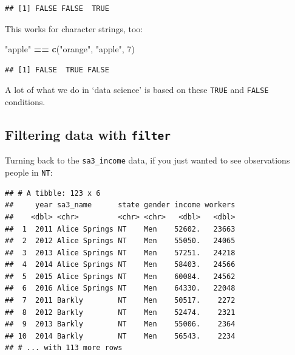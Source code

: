 \documentclass[]{book}
\newenvironment{Shaded}{\begin{snugshade}}{\end{snugshade}}
\newcommand{\DecValTok}[1]{\textcolor[rgb]{0.00,0.00,0.81}{#1}}
\newcommand{\KeywordTok}[1]{\textcolor[rgb]{0.13,0.29,0.53}{\textbf{#1}}}
\newcommand{\NormalTok}[1]{#1}
\newcommand{\OperatorTok}[1]{\textcolor[rgb]{0.81,0.36,0.00}{\textbf{#1}}}
\newcommand{\StringTok}[1]{\textcolor[rgb]{0.31,0.60,0.02}{#1}}
\begin{document}
\begin{verbatim}
## [1] FALSE FALSE  TRUE
\end{verbatim}

This works for character strings, too:

\begin{Shaded}
\begin{Highlighting}[]
\StringTok{"apple"} \OperatorTok{==}\StringTok{ }\KeywordTok{c}\NormalTok{(}\StringTok{"orange"}\NormalTok{, }\StringTok{"apple"}\NormalTok{, }\DecValTok{7}\NormalTok{)}
\end{Highlighting}
\end{Shaded}

\begin{verbatim}
## [1] FALSE  TRUE FALSE
\end{verbatim}

A lot of what we do in `data science' is based on these \texttt{TRUE} and \texttt{FALSE} conditions.

\hypertarget{filtering-data-with-filter}{%
\subsection{\texorpdfstring{Filtering data with \texttt{filter}}{Filtering data with filter}}\label{filtering-data-with-filter}}

Turning back to the \texttt{sa3\_income} data, if you just wanted to see observations people in \texttt{NT}:

\begin{Shaded}
\end{Shaded}

\begin{verbatim}
## # A tibble: 123 x 6
##     year sa3_name      state gender income workers
##    <dbl> <chr>         <chr> <chr>   <dbl>   <dbl>
##  1  2011 Alice Springs NT    Men    52602.   23663
##  2  2012 Alice Springs NT    Men    55050.   24065
##  3  2013 Alice Springs NT    Men    57251.   24218
##  4  2014 Alice Springs NT    Men    58403.   24566
##  5  2015 Alice Springs NT    Men    60084.   24562
##  6  2016 Alice Springs NT    Men    64330.   22048
##  7  2011 Barkly        NT    Men    50517.    2272
##  8  2012 Barkly        NT    Men    52474.    2321
##  9  2013 Barkly        NT    Men    55006.    2364
## 10  2014 Barkly        NT    Men    56543.    2234
## # ... with 113 more rows
\end{verbatim}
\end{document}
